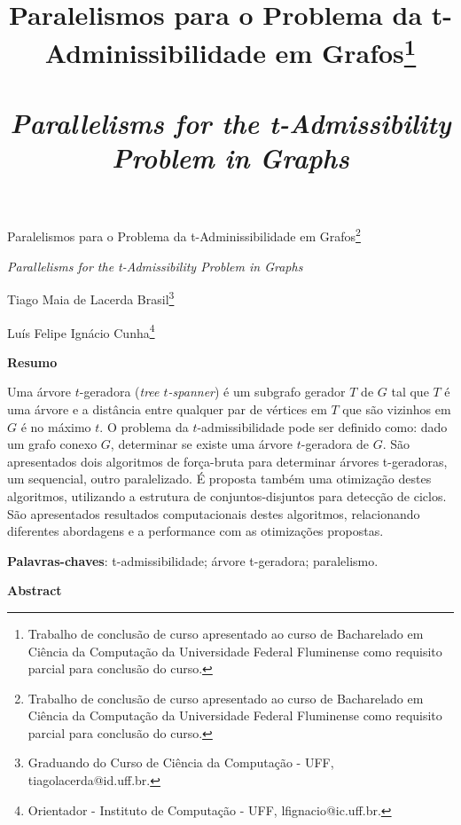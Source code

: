 \documentclass[article,a4paper,12pt,brazil,sumario=tradicional]{abntex2}
\title{ {\Large Paralelismos para o Problema da t-Adminissibilidade em Grafos\footnote{Trabalho de conclusão de curso apresentado ao curso de Bacharelado em Ciência da Computação da Universidade Federal Fluminense como requisito parcial para conclusão do curso.}\\\\
\vspace{.2}
\textit{Parallelisms for the t-Admissibility Problem in Graphs}\\}}
\date{ }
\theoremstyle{definition} %
\begin{document}
\textual

\begin{center}
{\Large Paralelismos para o Problema da t-Adminissibilidade em Grafos\footnote{Trabalho de conclusão de curso apresentado ao curso de Bacharelado em Ciência da Computação da Universidade Federal Fluminense como requisito parcial para conclusão do curso.}

\textit{Parallelisms for the t-Admissibility Problem in Graphs}\\}
\end{center}
\vspace{.2cm}

\begin{flushright}
Tiago Maia de Lacerda Brasil\footnote{Graduando do Curso de Ciência da Computação - UFF, tiagolacerda@id.uff.br.}

Luís Felipe Ignácio Cunha\footnote{Orientador - Instituto de Computação - UFF, lfignacio@ic.uff.br.}
\end{flushright}

\vspace{\onelineskip}

\begin{center}
    \textbf{Resumo}
\end{center}

\vspace{-.3cm}

\noindent Uma árvore $t$-geradora (\textit{tree $t$-spanner}) é um subgrafo gerador $T$ de $G$ tal que $T$ é uma árvore e a distância entre qualquer par de vértices em $T$ que são vizinhos em $G$ é no máximo $t$. O problema da $t$-admissibilidade pode ser definido como: dado um grafo conexo $G$, determinar se existe uma árvore $t$-geradora de $G$. São apresentados dois algoritmos de força-bruta para determinar árvores t-geradoras, um sequencial, outro paralelizado. É proposta também uma otimização destes algoritmos, utilizando a estrutura de conjuntos-disjuntos para detecção de ciclos. São apresentados resultados computacionais destes algoritmos, relacionando diferentes abordagens e a performance com as otimizações propostas.

\vspace{.4cm}

\noindent
\textbf{Palavras-chaves}: t-admissibilidade; árvore t-geradora; paralelismo.

\vspace{\onelineskip}

\begin{center}
    \textbf{Abstract}
\end{center}
\end{document}
